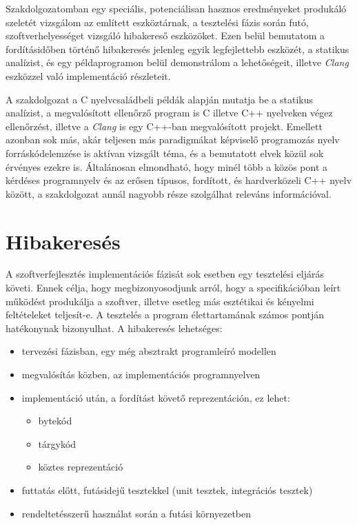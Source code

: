\documentclass[a4paper,12pt]{report}
\begin{document}
Szakdolgozatomban egy speciális, potenciálisan hasznos eredményeket produkáló szeletét vizsgálom az említett eszköztárnak, a tesztelési fázis során futó, szoftverhelyességet vizsgáló hibakereső eszközöket. Ezen belül bemutatom a fordításidőben történő hibakeresés jelenleg egyik legfejlettebb eszközét, a statikus analízist, és egy példaprogramon belül demonstrálom a lehetőségeit, illetve \emph{Clang} eszközzel való implementáció részleteit.

A szakdolgozat a C nyelvcsaládbeli példák alapján mutatja be a statikus analízist, a megvalósított ellenőrző program is C illetve C++ nyelveken végez ellenőrzést, illetve a \emph{Clang} is egy C++-ban megvalósított projekt. Emellett azonban sok más, akár teljesen más paradigmákat képviselő programozás nyelv forráskódelemzése is aktívan vizsgált téma, és a bemutatott elvek közül sok érvényes ezekre is. Általánosan elmondható, hogy minél több a közös pont a kérdéses programnyelv és az erősen típusos, fordított, és hardverközeli C++ nyelv között, a szakdolgozat annál nagyobb része szolgálhat releváns információval.

\section{Hibakeresés}
A szoftverfejlesztés implementációs fázisát sok esetben egy tesztelési eljárás követi. Ennek célja, hogy megbizonyosodjunk arról, hogy a specifikációban leírt működést produkálja a szoftver, illetve esetleg más esztétikai és kényelmi feltételeket teljesít-e.
A tesztelés a program élettartamának számos pontján hatékonynak bizonyulhat. A hibakeresés lehetséges:
\begin{itemize}
\item tervezési fázisban, egy még absztrakt programleíró modellen
\item megvalósítás közben, az implementációs programnyelven
\item implementáció után, a fordítást követő reprezentáción, ez lehet:
\begin{itemize}
\item bytekód
\item tárgykód
\item köztes reprezentáció
\end{itemize}
\item futtatás előtt, futásidejű tesztekkel (unit tesztek, integrációs tesztek)
\item rendeltetésszerű használat során a futási környezetben \cite{chaosmonkey}
\end{itemize}
\end{document}

